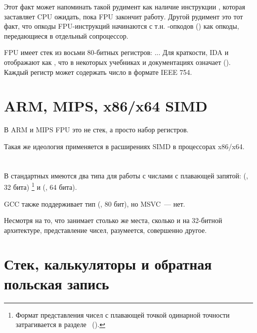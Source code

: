 Этот факт может напоминать такой рудимент как наличие инструкции , которая заставляет
\ac{CPU} ожидать, пока \ac{FPU} закончит работу.
Другой рудимент это тот факт, что опкоды \ac{FPU}-инструкций начинаются с т.н. -опкодов 
() как опкоды, передающиеся в отдельный сопроцессор.

\label{FPU_is_stack}
FPU имеет стек из восьми 80-битных регистров: ...
Для краткости, IDA и \olly отображают  как ,
что в некоторых учебниках и документациях означает  ().
Каждый регистр может содержать число в формате IEEE 754\FNURLIEEE.

\section{ARM, MIPS, x86/x64 SIMD}

В ARM и MIPS FPU это не стек, а просто набор регистров.

Такая же идеология применяется в расширениях SIMD в процессорах x86/x64.

\section{\CCpp}

В стандартных \CCpp имеются два типа для работы с числами с плавающей запятой: 
\Tfloat (\FNURLSP, 32 бита)
\footnote{Формат представления чисел с плавающей точкой одинарной точности затрагивается в разделе 
\IT{\WorkingWithFloatAsWithStructSubSubSectionName}~().}
и \Tdouble (\FNURLDP, 64 бита).

GCC также поддерживает тип  (\FNURLEP, 80 бит), но MSVC~--- нет.

Несмотря на то, что \Tfloat занимает столько же места, сколько и \Tint на 32-битной архитектуре, 
представление чисел, разумеется, совершенно другое.





\section{Стек, калькуляторы и обратная польская запись}

